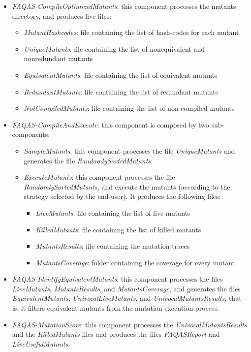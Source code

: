 \begin{itemize}
	\item \textit{FAQAS-CompileOptimizedMutants}: this component processes the mutants directory, and produces five files: 
	\begin{itemize}
		\item \textit{MutantHashcodes}: file containing the list of hash-codes for each mutant
		\item \textit{UniqueMutants}: file containing the list of nonequivalent and nonredundant mutants
		\item \textit{EquivalentMutants}: file containing the list of equivalent mutants
		\item \textit{RedundantMutants}: file containing the list of redundant mutants
		\item \textit{NotCompiledMutants}: file containing the list of non-compiled mutants
	\end{itemize}
	\item \textit{FAQAS-CompileAndExecute}: this component is composed by two sub-components:
		\begin{itemize}
			\item \textit{SampleMutants}: this component processes the file \textit{UniqueMutants} and generates the file \textit{RandomlySortedMutants}
			\item \textit{ExecuteMutants}: this component processes the file \textit{RandomlySortedMutants}, and execute the mutants (according to the strategy selected by the end-user). It produces the following files:
			\begin{itemize}
				\item \textit{LiveMutants}: file containing the list of live mutants
				\item \textit{KilledMutants}: file containing the list of killed mutants
				\item \textit{MutantsResults}: file containing the mutation traces
				\item \textit{MutantsCoverage}: folder containing the coverage for every mutant
			\end{itemize}
		\end{itemize}
	\item \textit{FAQAS-IdentifyEquivalentMutants}: this component processes the files \textit{LiveMutants}, \textit{MutantsResults}, and \textit{MutantsCoverage}, and generates the files \textit{EquivalentMutants}, \textit{UnivocalLiveMutants}, and \textit{UnivocalMutantsResults}, that is, it filters equivalent mutants from the mutation execution process.

	\item \textit{FAQAS-MutationScore}: this component processes the \textit{UnivocalMutantsResults} and the \textit{KilledMutants} files and produces the files \textit{FAQASReport} and \textit{LiveUsefulMutants}.
\end{itemize}

